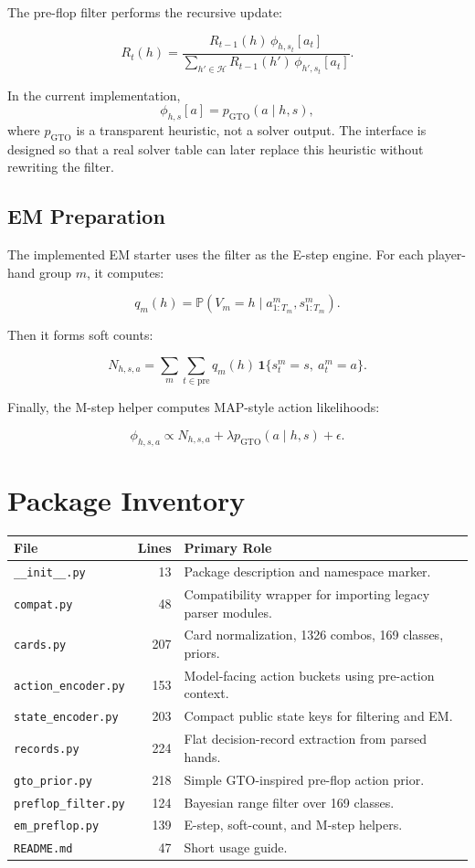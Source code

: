 \documentclass[11pt]{article}
\newcommand{\Hcal}{\mathcal{H}}
\newcommand{\Prb}{\mathbb{P}}
\begin{document}
The pre-flop filter performs the recursive update:

\[
R_t(h)
=
\frac{
R_{t-1}(h)\,\phi_{h,s_t}[a_t]
}{
\sum_{h' \in \Hcal} R_{t-1}(h')\,\phi_{h',s_t}[a_t]
}.
\]

In the current implementation,
\[
\phi_{h,s}[a] = p_{\mathrm{GTO}}(a \mid h,s),
\]
where \(p_{\mathrm{GTO}}\) is a transparent heuristic, not a solver output.
The interface is designed so that a real solver table can later replace this
heuristic without rewriting the filter.

\subsection{EM Preparation}

The implemented EM starter uses the filter as the E-step engine. For each
player-hand group \(m\), it computes:

\[
q_m(h)
=
\Prb(V_m=h \mid a^m_{1:T_m}, s^m_{1:T_m}).
\]

Then it forms soft counts:

\[
N_{h,s,a}
=
\sum_m
\sum_{t \in \mathrm{pre}}
q_m(h)\,
\mathbf{1}\{s_t^m=s,\ a_t^m=a\}.
\]

Finally, the M-step helper computes MAP-style action likelihoods:

\[
\phi_{h,s,a}
\propto
N_{h,s,a}
+ \lambda p_{\mathrm{GTO}}(a\mid h,s)
+ \epsilon.
\]

\section{Package Inventory}

\begin{center}
\begin{tabular}{lrp{8.3cm}}
\toprule
\textbf{File} & \textbf{Lines} & \textbf{Primary Role} \\
\midrule
\texttt{\_\_init\_\_.py} & 13 & Package description and namespace marker. \\
\texttt{compat.py} & 48 & Compatibility wrapper for importing legacy parser modules. \\
\texttt{cards.py} & 207 & Card normalization, 1326 combos, 169 classes, priors. \\
\texttt{action\_encoder.py} & 153 & Model-facing action buckets using pre-action context. \\
\texttt{state\_encoder.py} & 203 & Compact public state keys for filtering and EM. \\
\texttt{records.py} & 224 & Flat decision-record extraction from parsed hands. \\
\texttt{gto\_prior.py} & 218 & Simple GTO-inspired pre-flop action prior. \\
\texttt{preflop\_filter.py} & 124 & Bayesian range filter over 169 classes. \\
\texttt{em\_preflop.py} & 139 & E-step, soft-count, and M-step helpers. \\
\texttt{README.md} & 47 & Short usage guide. \\
\bottomrule
\end{tabular}
\end{center}
\end{document}
